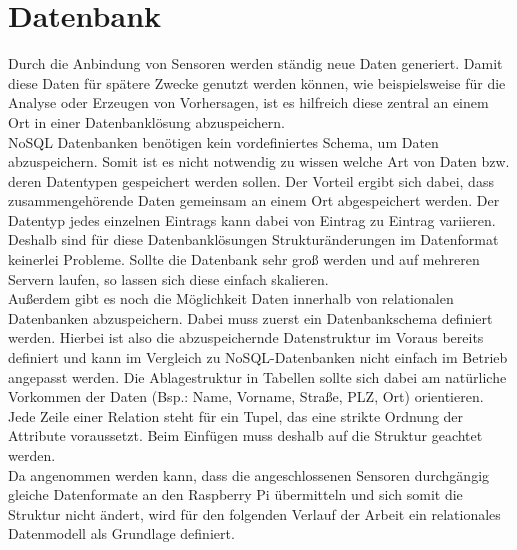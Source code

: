 \section{Datenbank}%
Durch die Anbindung von Sensoren werden ständig neue Daten generiert. Damit diese Daten für spätere Zwecke genutzt werden können, wie beispielsweise für die Analyse oder Erzeugen von Vorhersagen, ist es hilfreich diese zentral an einem Ort in einer Datenbanklösung abzuspeichern.
\\NoSQL Datenbanken benötigen kein vordefiniertes Schema, um Daten abzuspeichern. Somit ist es nicht notwendig zu wissen welche Art von Daten bzw. deren Datentypen gespeichert werden sollen. Der Vorteil ergibt sich dabei, dass zusammengehörende Daten gemeinsam an einem Ort abgespeichert werden. Der Datentyp jedes einzelnen Eintrags kann dabei von Eintrag zu Eintrag variieren. Deshalb sind für diese Datenbanklösungen Strukturänderungen im Datenformat keinerlei Probleme. Sollte die Datenbank sehr groß werden und auf mehreren Servern laufen, so lassen sich diese einfach skalieren\cite{noSQL:noSQL}.
\\Außerdem gibt es noch die Möglichkeit Daten innerhalb von relationalen Datenbanken abzuspeichern. Dabei muss zuerst ein Datenbankschema definiert werden. Hierbei ist also die abzuspeichernde Datenstruktur im Voraus bereits definiert und kann im Vergleich zu NoSQL-Datenbanken nicht einfach im Betrieb angepasst werden. Die Ablagestruktur in Tabellen sollte sich dabei am natürliche Vorkommen der Daten (Bsp.: Name, Vorname, Straße, PLZ, Ort)  orientieren. Jede Zeile einer Relation steht für ein Tupel, das eine strikte Ordnung der Attribute voraussetzt\cite{codd:Codd}. Beim Einfügen muss deshalb auf die Struktur geachtet werden.
\\Da angenommen werden kann, dass die angeschlossenen Sensoren durchgängig gleiche Datenformate an den Raspberry Pi übermitteln und sich somit die Struktur nicht ändert, wird für den folgenden Verlauf der Arbeit ein relationales Datenmodell als Grundlage definiert. 


